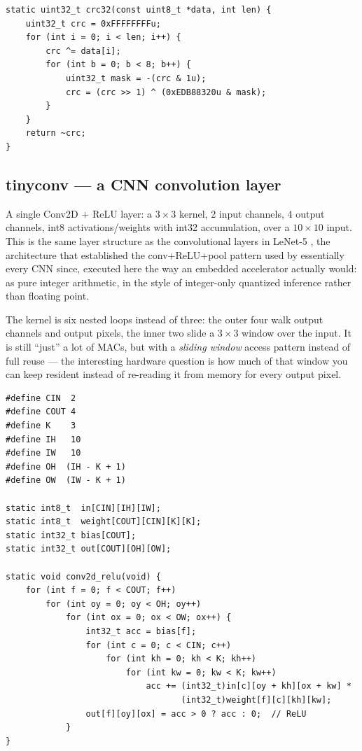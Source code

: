 \documentclass[11pt]{article}
\begin{document}
\begin{lstlisting}[style=clisting]
static uint32_t crc32(const uint8_t *data, int len) {
    uint32_t crc = 0xFFFFFFFFu;
    for (int i = 0; i < len; i++) {
        crc ^= data[i];
        for (int b = 0; b < 8; b++) {
            uint32_t mask = -(crc & 1u);
            crc = (crc >> 1) ^ (0xEDB88320u & mask);
        }
    }
    return ~crc;
}
\end{lstlisting}

\subsection{tinyconv --- a CNN convolution layer}

A single Conv2D + ReLU layer: a $3{\times}3$ kernel, 2 input channels, 4
output channels, int8 activations/weights with int32 accumulation, over a
$10{\times}10$ input. This is the same layer structure as the convolutional
layers in LeNet-5 \cite{lecun1998gradient}, the architecture that established
the conv+ReLU+pool pattern used by essentially every CNN since, executed here
the way an embedded accelerator actually would: as pure integer arithmetic,
in the style of integer-only quantized inference \cite{jacob2018quantization}
rather than floating point.

The kernel is six nested loops instead of three: the outer four walk output
channels and output pixels, the inner two slide a $3{\times}3$ window over
the input. It is still ``just'' a lot of MACs, but with a \emph{sliding
window} access pattern instead of full reuse --- the interesting hardware
question is how much of that window you can keep resident instead of
re-reading it from memory for every output pixel.

\begin{lstlisting}[style=clisting]
#define CIN  2
#define COUT 4
#define K    3
#define IH   10
#define IW   10
#define OH  (IH - K + 1)
#define OW  (IW - K + 1)

static int8_t  in[CIN][IH][IW];
static int8_t  weight[COUT][CIN][K][K];
static int32_t bias[COUT];
static int32_t out[COUT][OH][OW];

static void conv2d_relu(void) {
    for (int f = 0; f < COUT; f++)
        for (int oy = 0; oy < OH; oy++)
            for (int ox = 0; ox < OW; ox++) {
                int32_t acc = bias[f];
                for (int c = 0; c < CIN; c++)
                    for (int kh = 0; kh < K; kh++)
                        for (int kw = 0; kw < K; kw++)
                            acc += (int32_t)in[c][oy + kh][ox + kw] *
                                   (int32_t)weight[f][c][kh][kw];
                out[f][oy][ox] = acc > 0 ? acc : 0;  // ReLU
            }
}
\end{lstlisting}
\end{document}
